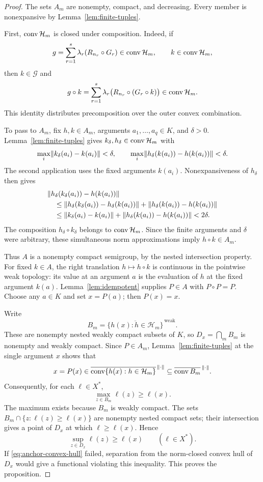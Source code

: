 \begin{proof}
The sets $A_m$ are nonempty, compact, and decreasing.  Every member
is nonexpansive by Lemma~\ref{lem:finite-tuples}.

First, $\operatorname{conv}\mathcal H_m$ is closed under composition.  Indeed, if
\[
 g=\sum_{r=1}^s\lambda_r(R_{n_r}\circ G_r)
 \in\operatorname{conv}\mathcal H_m,
 \qquad k\in\operatorname{conv}\mathcal H_m,
\]
then $k\in\mathcal G$ and
\[
 g\circ k
 =\sum_{r=1}^s\lambda_r\bigl(R_{n_r}\circ(G_r\circ k)\bigr)
 \in\operatorname{conv}\mathcal H_m.
\]
This identity distributes precomposition over the outer convex
combination.

To pass to $A_m$, fix $h,k\in A_m$, arguments $a_1,\ldots,a_q\in K$,
and $\delta>0$.  Lemma~\ref{lem:finite-tuples} gives
$k_\delta,h_\delta\in\operatorname{conv}\mathcal H_m$ with
\[
 \max_i\lVert k_\delta(a_i)-k(a_i)\rVert<\delta,
 \qquad
 \max_i\lVert h_\delta(k(a_i))-h(k(a_i))\rVert<\delta.
\]
The second application uses the fixed arguments $k(a_i)$.
Nonexpansiveness of $h_\delta$ then gives
\begin{align*}
 &\lVert h_\delta(k_\delta(a_i))-h(k(a_i))\rVert\\
 &\quad\leq
   \lVert h_\delta(k_\delta(a_i))-h_\delta(k(a_i))\rVert
   +\lVert h_\delta(k(a_i))-h(k(a_i))\rVert\\
 &\quad\leq\lVert k_\delta(a_i)-k(a_i)\rVert
   +\lVert h_\delta(k(a_i))-h(k(a_i))\rVert
   <2\delta.
\end{align*}
The composition $h_\delta\circ k_\delta$ belongs to
$\operatorname{conv}\mathcal H_m$.  Since the finite arguments and $\delta$ were
arbitrary, these simultaneous norm approximations imply
$h\circ k\in A_m$.

Thus $A$ is a nonempty compact semigroup, by the nested intersection
property.  For fixed $k\in A$, the right translation
$h\mapsto h\circ k$ is continuous in the pointwise weak topology:
its value at an argument $a$ is the evaluation of $h$ at the fixed
argument $k(a)$.  Lemma~\ref{lem:idempotent} supplies $P\in A$ with
$P\circ P=P$.  Choose any $a\in K$ and set $x=P(a)$; then $P(x)=x$.

Write
\[
 B_m=\overline{\{h(x):h\in\mathcal H_m\}}^{\,\mathrm{weak}}.
\]
These are nonempty nested weakly compact subsets of $K$, so
$D_x=\bigcap_m B_m$ is nonempty and weakly compact.  Since
$P\in A_m$, Lemma~\ref{lem:finite-tuples} at the single argument $x$
shows that
\[
 x=P(x)\in
 \overline{\operatorname{conv}\{h(x):h\in\mathcal H_m\}}^{\,\lVert\cdot\rVert}
 \subseteq\overline{\operatorname{conv} B_m}^{\,\lVert\cdot\rVert}.
\]
Consequently, for each $\ell\in X^*$,
\[
 \max_{z\in B_m}\ell(z)\geq\ell(x).
\]
The maximum exists because $B_m$ is weakly compact.  The sets
$B_m\cap\{z:\ell(z)\geq\ell(x)\}$ are nonempty nested compact sets;
their intersection gives a point of $D_x$ at which
$\ell\geq\ell(x)$.  Hence
\[
 \sup_{z\in D_x}\ell(z)\geq\ell(x)\qquad(\ell\in X^*).
\]
If \eqref{eq:anchor-convex-hull} failed, separation from the
norm-closed convex hull of $D_x$ would give a functional violating
this inequality.  This proves the proposition.
\end{proof}


